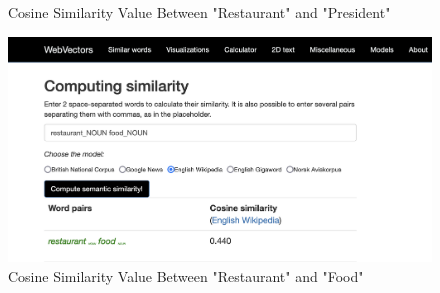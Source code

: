 \documentclass[12pt]{article}
\begin{document}
\begin{enumerate}
\begin{figure}
        \caption{Cosine Similarity Value Between "Restaurant" and "President"}
        \label{fig:cos-sim-1}
    \end{figure}
    \begin{figure}
        \centering
        \includegraphics[width=0.5\linewidth]{Q1-1-4.png}
        \caption{Cosine Similarity Value Between "Restaurant" and "Food"}
        \label{fig:cos-sim-2}
    \end{figure}
    

\end{enumerate}
\end{document}
